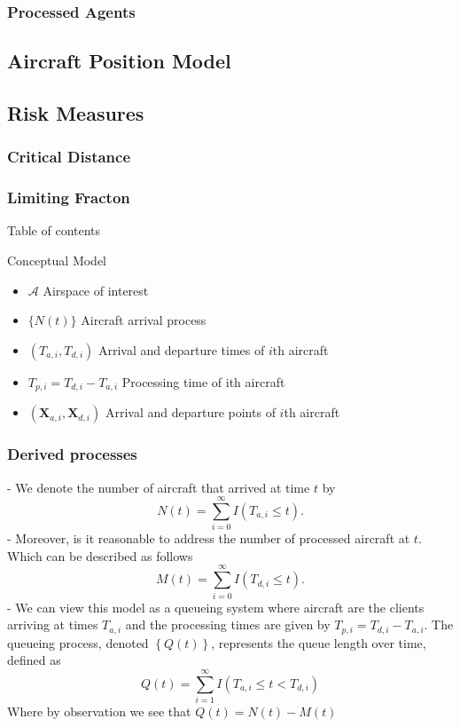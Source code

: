 \documentclass[UKenglish]{beamer}
\begin{document}
\subsubsection{Processed Agents}

\subsection{Aircraft Position Model}
\subsection{Risk Measures}
\subsubsection{Critical Distance}
\subsubsection{Limiting Fracton}

\begin{frame}[allowframebreaks]{Table of contents}
    \tableofcontents[currentsection, hideothersubsections, subsubsectionstyle=show/show/show/hide]   
\end{frame}
\begin{frame}{Conceptual Model}
\begin{itemize}
    \setlength{\itemsep}{7mm}
    \vspace{7mm}
    \item $\mathcal{A}$ Airspace of interest
    
    \item $\{N(t)\}$ Aircraft arrival process

    \item $\left(T_{a, i}, T_{d, i}\right)$ Arrival and departure times of $i$th aircraft

    \item $T_{p, i}=T_{d, i}-T_{a, i}$ Processing time of ith aircraft

    \item $\left(\boldsymbol{X}_{a, i}, \boldsymbol{X}_{d, i}\right)$ Arrival and departure points of $i$th aircraft
    
\end{itemize}

\end{frame}

\begin{frame}
   \frametitle{Derived processes}
- We denote the number of aircraft that arrived at time $t$ by 
$$N(t) = \sum_{i=0}^{\infty} I(T_{a,i} \leq t).$$
- Moreover, is it reasonable to address the number of processed aircraft at $t$. Which can be described as follows
$$M(t) = \sum_{i=0}^{\infty} I(T_{d,i} \leq t).$$
- We can view this model as a queueing system where aircraft are the clients arriving at times \( T_{a,i} \) and the processing times are given by \( T_{p,i} = T_{d,i} - T_{a,i} \). The queueing process, denoted \( \left\{Q(t) \right\}\), represents the queue length over time, defined as
$$Q(t) = \sum_{i=1}^{\infty} I(T_{a,i} \leq t < T_{d,i})$$
Where by observation we see that $Q(t) = N(t) - M(t)$
\end{frame}
\end{document}
